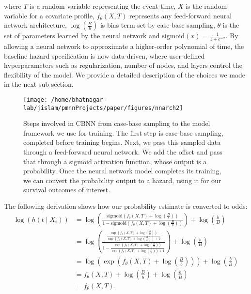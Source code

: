 \documentclass[AMA,STIX1COL,]{WileyNJD-v2}
\begin{document}
where \(T\) is a random variable representing the event time, \(X\) is
the random variable for a covariate profile, \(f_{\theta}(X, T)\)
represents any feed-forward neural network architecture,
\(\log\left(\frac{B}{b}\right)\) is bias term set by case-base sampling,
\(\theta\) is the set of parameters learned by the neural network and
\(\mathrm{sigmoid}(x)=\frac{1}{1+e^{-x}}\). By allowing a neural network
to approximate a higher-order polynomial of time, the baseline hazard
specification is now data-driven, where user-defined hyperparameters
such as regularization, number of nodes, and layers control the
flexibility of the model. We provide a detailed description of the
choices we made in the next sub-section.

\begin{figure}

{\centering \texttt{[image: /home/bhatnagar-lab/jislam/pmnnProjects/paper/figures/nnarch2]} 

}

\caption{Steps involved in CBNN from case-base sampling to the model framework we use for training. The first step is case-base sampling, completed before training begins. Next, we pass this sampled data through a feed-forward neural network. We add the offset and pass that through a sigmoid activation function, whose output is a probability. Once the neural network model completes its training, we can convert the probability output to a hazard, using it for our survival outcomes of interest.}\label{fig:NNarch}
\end{figure}

The following derivation shows how our probability estimate is converted
to odds: \begin{align*}
 \log\left( h(t \mid X_i) \right) &= \log\left(\frac{\mathrm{sigmoid}\left(f_{\theta}(X, T) + \log\left(\frac{B}{b}\right)\right)}{1-\mathrm{sigmoid}\left(f_{\theta}(X, T) + \log\left(\frac{B}{b}\right)\right)}\right) + \log\left(\frac{b}{B}\right) \\
 &= \log\left( \frac{\frac{\exp\left(f_{\theta}(X, T) + \log\left(\frac{B}{b}\right)\right)}{\exp\left(f_{\theta}(X, T) + \log\left(\frac{B}{b}\right)\right)+1}}{1-\frac{\exp\left(f_{\theta}(X, T) + \log\left(\frac{B}{b}\right)\right)}{\exp\left(f_{\theta}(X, T) + \log\left(\frac{B}{b}\right)\right)+1}}\right) + \log\left(\frac{b}{B}\right) \\
 &= \log\left(\exp\left( f_{\theta}(X, T) + \log\left(\frac{B}{b}\right) \right) \right) + \log\left(\frac{b}{B}\right) \\
 &= f_{\theta}(X, T) + \log\left(\frac{B}{b}\right) + \log\left(\frac{b}{B}\right) \\
&= f_{\theta}(X, T). 
\end{align*}
\end{document}
